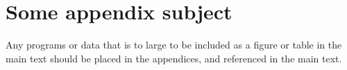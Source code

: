 \chapter{Some appendix subject}
Any programs or data that is to large to be included as a figure or table in the main text should be placed in the appendices, and referenced in the main text.
